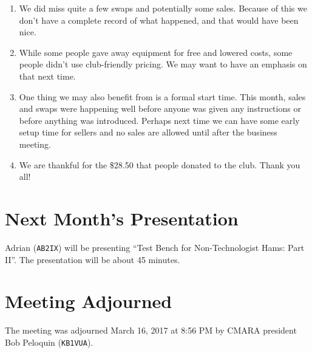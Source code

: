 \documentclass[10pt,letterpaper]{article}
\begin{document}
\begin{enumerate}
\item We did miss quite a few swaps and potentially some sales. Because of this we don't have a complete record of what happened, and that would have been nice.

\item While some people gave away equipment for free and lowered costs, some people didn't use club-friendly pricing. We may want to have an emphasis on that next time.

\item One thing we may also benefit from is a formal start time. This month, sales and swaps were happening well before anyone was given any instructions or before anything was introduced. Perhaps next time we can have some early setup time for sellers and no sales are allowed until after the business meeting.

\item We are thankful for the \$28.50 that people donated to the club. Thank you all!
\end{enumerate}

\section{Next Month's Presentation}
Adrian (\texttt{AB2IX}) will be presenting ``Test Bench for Non-Technologist Hams: Part II''. The presentation will be about 45 minutes.

\section{Meeting Adjourned}
The meeting was adjourned March 16, 2017 at 8:56 PM by CMARA president Bob Peloquin (\texttt{KB1VUA}).
\end{document}
